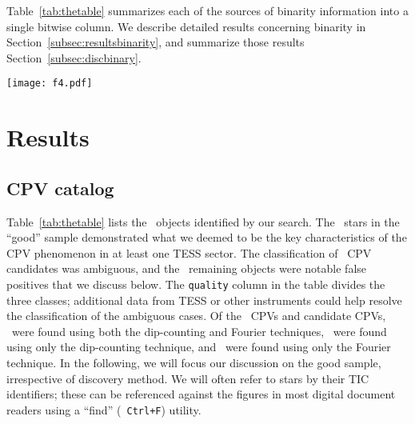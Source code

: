 \documentclass[11pt,twocolumn,tighten,linenumbers]{aastex63}
\begin{document}
Table~\ref{tab:thetable} summarizes each of the sources of binarity
information into a single bitwise column.  We describe detailed
results concerning binarity in Section~\ref{subsec:resultsbinarity},
and summarize those results Section~\ref{subsec:discbinary}.




\begin{figure*}[!tp]
	\begin{center}
		\centering
		\texttt{[image: f4.pdf]}
    \vspace{-0.3cm}
		\caption{
      {\bf CPVs found in the TESS 2-minute data.}
      Phased TESS light curves over one month are shown for \ngoods\
      CPVs in the high quality sample.  Gray are raw 2-minute data;
      black bins to 300 points per cycle.  Objects are ordered such
      that sources with the most TESS data available are on top (see
      Section~\ref{sec:catalog}).  Zero phase is chosen to correspond
      to minimum light.  Each panel is labeled by the TIC identifier,
      the TESS sector number, the period in hours, and the three-bit
      binarity flag from Table~\ref{tab:thetable}, which denotes Gaia
      DR3 \texttt{radial\_velocity\_error} outliers (bit 1), Gaia DR3
      \texttt{ruwe} outliers (bit 2), and stars with secondary TESS
      periods (bit 3). 
		}
		\label{fig:cpvs}
	\end{center}
\end{figure*}



\section{Results}
\label{sec:results}

\subsection{CPV catalog}
\label{sec:catalog}

Table~\ref{tab:thetable} lists the \nallcands\ objects identified by
our search.  The \ngoods\ stars in the ``good'' sample demonstrated
what we deemed to be the key characteristics of the CPV phenomenon in
at least one TESS sector.  The classification of \nmaybes\ CPV
candidates was ambiguous, and the \ndebunked\ remaining objects were
notable false positives that we discuss below.  The \texttt{quality}
column in the table divides the three classes; additional data from
TESS or other instruments could help resolve the classification of the
ambiguous cases.   Of the \ncqvsnodebunked\ CPVs and candidate CPVs,
\nbothdipfourier\ were found using both the dip-counting and Fourier
techniques, \nyesdipnofourier\ were found using only the dip-counting
technique, and \nyesfouriernodip\ were found using only the Fourier
technique.  In the following, we will focus our discussion on the good
sample, irrespective of discovery method.  We will often refer to
stars by their TIC identifiers; these can be referenced against the
figures in most digital document readers using a ``find'' ({\tt
Ctrl+F}) utility.
\end{document}
